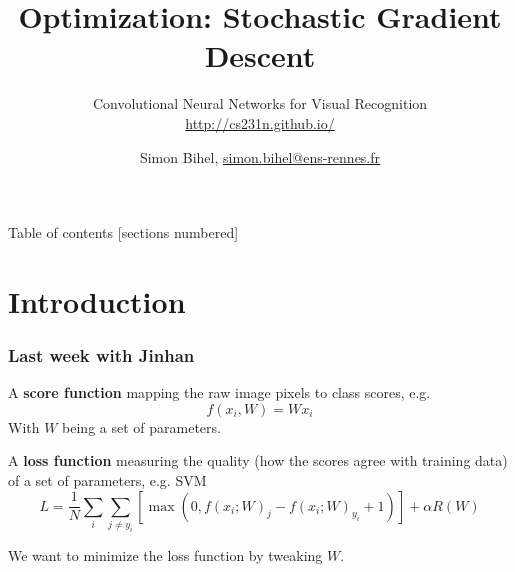 \documentclass{beamer}
\title{Optimization: Stochastic Gradient Descent}
\subtitle{Convolutional Neural Networks for Visual Recognition\\
\url{http://cs231n.github.io/}}
\date{\displaydate{seminardate}}
\author{%
  Simon Bihel, \url{simon.bihel@ens-rennes.fr} \\
}
\institute{%
  COINSE Lab, KAIST%
}
\begin{document}
\maketitle

\begin{frame}{Table of contents}
  [sections numbered]
  \tableofcontents[hideallsubsections]
\end{frame}


\section{Introduction}
\begin{frame}
  \frametitle{Last week with Jinhan}
  A \textbf{score function} mapping the raw image pixels to class scores, e.g.
  \[f(x_i, W) =  W x_i\]
  With $W$ being a set of parameters.

  A \textbf{loss function} measuring the quality (how the scores agree with training data) of a set of parameters, e.g. SVM
  \[L = \frac{1}{N} \sum_i \sum_{j\neq y_i} \left[ \max(0, f(x_i; W)_j - f(x_i; W)_{y_i} + 1) \right] + \alpha R(W)\]

  We want to minimize the loss function by tweaking $W$.
\end{frame}
\end{document}
